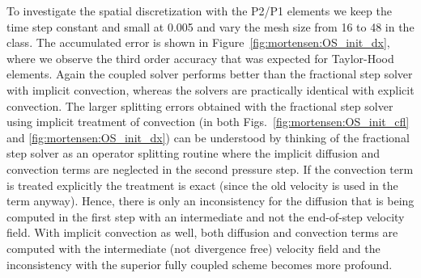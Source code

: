 To investigate the spatial discretization with the P2/P1 elements we
keep the time step constant and small at 0.005 and vary the mesh size
from 16 to 48 in the  class. The accumulated error is
shown in Figure~\ref{fig:mortensen:OS_init_dx}, where we observe the
third order accuracy that was expected for Taylor-Hood elements. Again
the coupled solver performs better than the fractional step solver
with implicit convection, whereas the solvers are practically identical
with explicit convection. The larger splitting errors obtained with the
fractional step solver using implicit treatment of convection (in both
Figs.~\ref{fig:mortensen:OS_init_cfl} and \ref{fig:mortensen:OS_init_dx})
can be understood by thinking of the fractional step solver as an operator
splitting routine where the implicit diffusion and convection terms are
neglected in the second pressure step. If the convection term is treated
explicitly the treatment is exact (since the old velocity is used in the
term anyway). Hence, there is only an inconsistency for the diffusion
that is being computed in the first step with an intermediate and not
the end-of-step velocity field. With implicit convection as well, both
diffusion and convection terms are computed with the intermediate (not
divergence free) velocity field and the inconsistency with the superior
fully coupled scheme becomes more profound.

